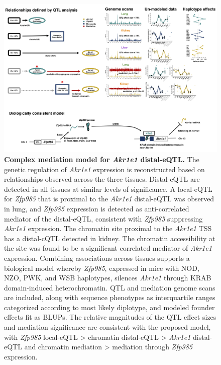 \documentclass[9pt,twocolumn,twoside]{gsajnl}
\begin{document}
\begin{figure}[hp]
\renewcommand{\familydefault}{\sfdefault}\normalfont
\centering
\includegraphics[width=\textwidth, trim={0in 0.1in 0in 0in}, clip]{figs/akr1e1_full_model_update.png}
\caption{\textbf{Complex mediation model for \textit{Akr1e1} distal-eQTL.}  The genetic regulation of \textit{Akr1e1} expression is reconstructed based on relationships observed across the three tissues. Distal-eQTL are detected in all tissues at similar levels of significance. A local-eQTL for \textit{Zfp985} that is proximal to the \textit{Akr1e1} distal-eQTL was observed in lung, and \textit{Zfp985} expression is detected as anti-correlated mediator of the distal-eQTL, consistent with \textit{Zfp985} suppressing \textit{Akr1e1} expression. The chromatin site proximal to the \textit{Akr1e1} TSS has a distal-cQTL detected in kidney. The chromatin accessibility at the site was found to be a significant correlated mediator of \textit{Akr1e1} expression. Combining associations across tissues supports a biological model whereby \textit{Zfp985}, expressed in mice with NOD, NZO, PWK, and WSB haplotypes, silences \textit{Akr1e1} through KRAB domain-induced heterochromatin. QTL and mediation genome scans are included, along with sequence phenotypes as interquartile ranges categorized according to most likely diplotype, and modeled founder effects fit as BLUPs. The relative magnitudes of the QTL effect sizes and mediation significance are consistent with the proposed model, with \textit{Zfp985} local-eQTL > chromatin distal-eQTL > \textit{Akr1e1} distal-eQTL and chromatin mediation > mediation through \textit{Zfp985} expression.
\label{fig:akr1e1_full_model}}
\end{figure}
\end{document}
